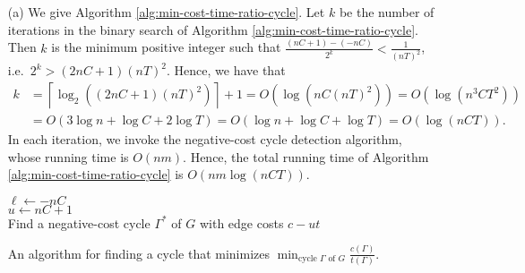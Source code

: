 \documentclass[letterpaper,reqno,12pt]{article}
\begin{document}
\begin{exercise}
  \begin{enumerate}
    \item[(a)] We give Algorithm \ref{alg:min-cost-time-ratio-cycle}. Let $k$ be the number of iterations in the binary search of Algorithm \ref{alg:min-cost-time-ratio-cycle}. Then $k$ is the minimum positive integer such that $\frac{(nC + 1) - (-nC)}{2^k} < \frac{1}{(nT)^2}$, i.e.\ $2^k > (2nC + 1)(nT)^2$. Hence, we have that
    \begin{align*}
      k &= \left\lceil \log_2 \left((2nC + 1)(nT)^2\right) \right\rceil + 1 = O\left(\log \left(nC (nT)^2\right)\right) = O\left(\log \left(n^3 CT^2\right)\right) \\
      &= O(3\log n + \log C + 2\log T) = O(\log n + \log C + \log T) = O(\log (nCT)).
    \end{align*}
    In each iteration, we invoke the negative-cost cycle detection algorithm, whose running time is $O(nm)$. Hence, the total running time of Algorithm \ref{alg:min-cost-time-ratio-cycle} is $O(nm\log(nCT))$.

    \begin{algorithm}
      $\ell \leftarrow -nC$ \\
      $u \leftarrow nC + 1$ \\
      Find a negative-cost cycle $\Gamma^*$ of $G$ with edge costs $c - ut$ \\
      \Return{$\Gamma^*$}
      \caption{An algorithm for finding a cycle that minimizes $\min_\text{cycle $\Gamma$ of $G$} \frac{c(\Gamma)}{t(\Gamma)}$.}
      \label{alg:min-cost-time-ratio-cycle}
    \end{algorithm}


\end{enumerate}
\end{exercise}
\end{document}

